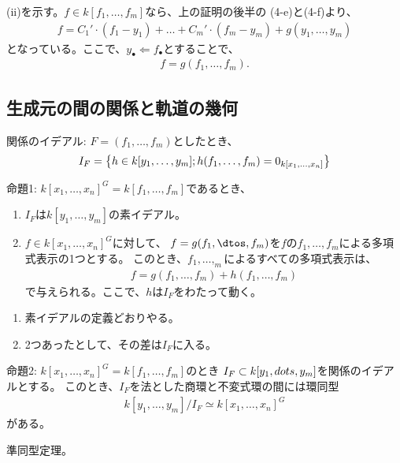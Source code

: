 \begin{myproof}
  (ii)を示す。$f\in k[f_1,\dots,f_m]$なら、上の証明の後半の
  (4-e)と(4-f)より、
  \begin{align}
    f = C_1' \cdot (f_1-y_1) + \dots + C_m'\cdot (f_m-y_m) + g(y_1,\dots,y_m)
  \end{align}
  となっている。ここで、$y_\bullet \Leftarrow f_\bullet$とすることで、
  \begin{align}
    f = g(f_1,\dots,f_m).
  \end{align}

\end{myproof}

\subsection{生成元の間の関係と軌道の幾何}
\label{sub:生成元の間の関係と軌道の幾何}

\begin{framed}
  関係のイデアル:
  $F=(f_1,\dots,f_m)$としたとき、
  \begin{align}
    I_F = \left\{h\in k[y_1,\dots,y_m]; h(f_1,\dots,f_m) = 0_{k[x_1,\dots,x_n]}\right\}
  \end{align}
\end{framed}

\begin{framed}
  命題1:
  $k[x_1,\dots,x_n]^G = k[f_1,\dots,f_m]$であるとき、
  \begin{enumerate}[label=(\roman*)]
    \item $I_F$は$k[y_1,\dots,y_m]$の素イデアル。
    \item $f\in k[x_1,\dots,x_n]^G$に対して、
    $f=g(f_1,\dtos,f_m)$を$f$の$f_1,\dots,f_m$による多項式表示の1つとする。
    このとき、$f_1,\dots,_m$によるすべての多項式表示は、
    \begin{align}
      f=g(f_1,\dots,f_m) + h(f_1,\dots,f_m)
    \end{align}
    で与えられる。ここで、$h$は$I_F$をわたって動く。
  \end{enumerate}
\end{framed}
\begin{myproof}
  \begin{enumerate}[label=(\arabic*)]
    \item 素イデアルの定義どおりやる。
    \item 2つあったとして、その差は$I_F$に入る。
  \end{enumerate}
\end{myproof}

\begin{framed}
  命題2:
  $k[x_1,\dots,x_n]^G = k[f_1,\dots,f_m]$のとき
  $I_F \subset k[y_1,\\dots,y_m]$を関係のイデアルとする。
  このとき、$I_F$を法とした商環と不変式環の間には環同型
  \begin{align}
    k[y_1,\dots,y_m]/I_F \simeq k[x_1,\dots,x_n]^G
  \end{align}
  がある。
\end{framed}
\begin{myproof}
  準同型定理。
\end{myproof}

